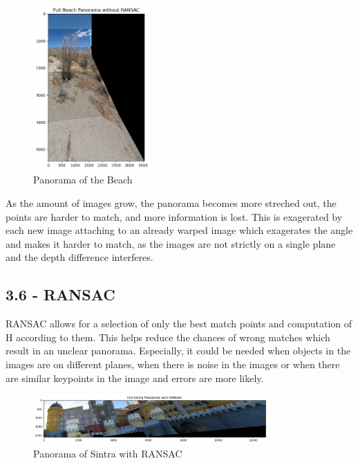 \documentclass{article}
\begin{document}
\begin{figure}[h!]
    \centering
    \includegraphics[width=0.4\textwidth]{../output/3.5_beach_pan.png}
    \caption{Panorama of the Beach}
    \label{fig:3_5_beach_pan}
\end{figure}

As the amount of images grow, the panorama becomes more streched out, the points are harder to match, and more information is lost. This is exagerated by each new image attaching to an already warped image which exagerates the angle and makes it harder to match, as the images are not strictly on a single plane and the depth difference interferes.

\subsection*{3.6 - RANSAC}

RANSAC allows for a selection of only the best match points and computation of H according to them. This helps reduce the chances of wrong matches which result in an unclear panorama. Especially, it could be needed when objects in the images are on different planes, when there is noise in the images or when there are similar keypoints in the image and errors are more likely.

\begin{figure}[h!]
    \centering
    \includegraphics[width=0.8\textwidth]{../output/3.6_sintra.png}
    \caption{Panorama of Sintra with RANSAC}
    \label{fig:3_6_sintra}
\end{figure}
\end{document}
